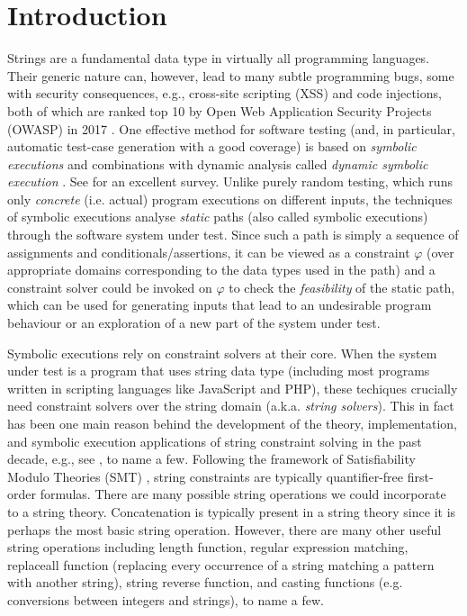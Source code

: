 \section{Introduction}
\label{sec:intro}

Strings are a fundamental data type in virtually all programming languages.
Their generic nature can, however, lead to many subtle programming 
bugs, some with security consequences, e.g., cross-site scripting
(XSS) and code injections, both of which are ranked top 10 by Open Web
Application Security Projects (OWASP) in 2017 \cite{owasp17}. One effective
method for software testing (and, in particular, automatic test-case 
generation with a good coverage) is based on \emph{symbolic executions} 
\cite{king76} and combinations with dynamic analysis
called \emph{dynamic symbolic execution} \cite{jalangi,DART,EXE,CUTE,KLEE}.
See \cite{symbex-survey} for an excellent survey. Unlike purely random testing,
which runs only \emph{concrete} (i.e. actual) program executions on different 
inputs, the techniques of symbolic executions analyse \emph{static} paths
(also called symbolic executions) through the software system under test.
Since such a path is simply a sequence of assignments and
conditionals/assertions, it can be viewed as a constraint $\varphi$ (over 
appropriate domains corresponding to the data types used in the path) and a 
constraint solver could be invoked on $\varphi$ to check the \emph{feasibility}
of the static path, which can be used for generating inputs that lead to 
an undesirable program behaviour or an exploration of a new part of the
system under test.

Symbolic executions rely on constraint solvers at their core. When the system
under test is a program that uses string data type (including most programs 
written in scripting languages like JavaScript and PHP), these techiques 
crucially need constraint solvers over the string domain (a.k.a. \emph{string 
solvers}). This in fact has been one main reason behind the development of
the theory, implementation, and symbolic execution applications of string constraint 
solving in the past decade, e.g., see 
\cite{BTV09,Berkeley-JavaScript,HAMPI,Stranger,Vijay-length,YABI14,Abdulla14,LB16,fang-yu-circuits,Abdulla17,CCHLW18,HJLRV18,S3,TCJ16,Z3-str,cvc4,BCFJKKV08,RVG12,jalangi,expose},
to name a few. 
Following the framework of Satisfiability Modulo Theories (SMT)
\cite{SMT-CACM,SMT-chapter,KS08}, string constraints are typically 
quantifier-free first-order formulas. 
There are many possible string operations we could incorporate to a string 
theory.
Concatenation is typically present in a string theory since it is perhaps
the most basic string operation. However, there are many other useful string 
operations including length function, regular expression matching, 
replaceall
function (replacing every occurrence of a string matching a pattern with another
string), string reverse function, and casting functions (e.g. conversions
between integers and strings), to name a few.

